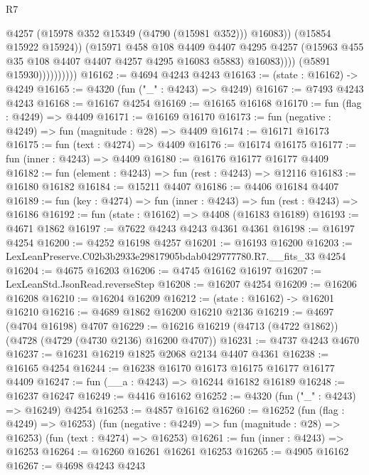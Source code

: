 \begin{lexlean}{R7}
\begin{coremodule}
                                  @4257
                                  (@15978 @352 @15349 (@4790 (@15981 @352)))
                                  @16083))
                              (@15854 @15922 @15924))
                            (@15971
                              @458
                              @108
                              @4409
                              @4407
                              @4295
                              @4257
                              (@15963 @455 @35 @108 @4407 @4407 @4257 @4295 @16083 @5883)
                              @16083))))
                      (@5891 @15930))))))))))
@16162 := @4694 @4243 @4243
@16163 := (state : @16162) -> @4249
@16165 := @4320 (fun ("_" : @4243) => @4249)
@16167 := @7493 @4243 @4243
@16168 := @16167 @4254
@16169 := @16165 @16168
@16170 := fun (flag : @4249) => @4409
@16171 := @16169 @16170
@16173 := fun (negative : @4249) => fun (magnitude : @28) => @4409
@16174 := @16171 @16173
@16175 := fun (text : @4274) => @4409
@16176 := @16174 @16175
@16177 := fun (inner : @4243) => @4409
@16180 := @16176 @16177 @16177 @4409
@16182 := fun (element : @4243) => fun (rest : @4243) => @12116
@16183 := @16180 @16182
@16184 := @15211 @4407
@16186 := @4406 @16184 @4407
@16189 := fun (key : @4274) => fun (inner : @4243) => fun (rest : @4243) => @16186
@16192 := fun (state : @16162) => @4408 (@16183 @16189)
@16193 := @4671 @1862
@16197 := @7622 @4243 @4243 @4361 @4361
@16198 := @16197 @4254
@16200 := @4252 @16198 @4257
@16201 := @16193 @16200
@16203 := LexLeanPreserve.C02b3b2933e29817905bdab0429777780.R7.__fits_33 @4254
@16204 := @4675 @16203
@16206 := @4745 @16162 @16197
@16207 := LexLeanStd.JsonRead.reverseStep
@16208 := @16207 @4254
@16209 := @16206 @16208
@16210 := @16204 @16209
@16212 := (state : @16162) -> @16201 @16210
@16216 := @4689 @1862 @16200 @16210 @2136
@16219 := @4697 (@4704 @16198) @4707
@16229 := @16216 @16219 (@4713 (@4722 @1862)) (@4728 (@4729 (@4730 @2136) @16200 @4707))
@16231 := @4737 @4243 @4670
@16237 := @16231 @16219 @1825 @2068 @2134 @4407 @4361
@16238 := @16165 @4254
@16244 := @16238 @16170 @16173 @16175 @16177 @16177 @4409
@16247 := fun (__a : @4243) => @16244 @16182 @16189
@16248 := @16237 @16247
@16249 := @4416 @16162
@16252 := @4320 (fun ("_" : @4243) => @16249) @4254
@16253 := @4857 @16162
@16260 := @16252
    (fun (flag : @4249) => @16253)
    (fun (negative : @4249) => fun (magnitude : @28) => @16253)
    (fun (text : @4274) => @16253)
@16261 := fun (inner : @4243) => @16253
@16264 := @16260 @16261 @16261 @16253
@16265 := @4905 @16162
@16267 := @4698 @4243 @4243

\end{coremodule}
\end{lexlean}
